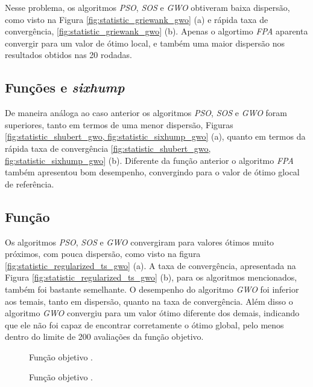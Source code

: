 \documentclass[a4paper, 11pt]{article}
\begin{document}
Nesse problema, os algoritmos \textit{PSO}, \textit{SOS} e \textit{GWO} obtiveram baixa dispersão, como visto na Figura \ref{fig:statistic_griewank_gwo} (a) e rápida taxa de convergência, \ref{fig:statistic_griewank_gwo} (b). Apenas o algortimo \textit{FPA} aparenta convergir para um valor de ótimo local, e também uma maior dispersão nos resultados obtidos nas 20 rodadas.

\subsection{Funções  e \textit{sixhump}}

De maneira análoga ao caso anterior os algoritmos \textit{PSO}, \textit{SOS} e \textit{GWO} foram superiores, tanto em termos de uma menor dispersão, Figuras \ref{fig:statistic_shubert_gwo, fig:statistic_sixhump_gwo} (a), quanto em termos da rápida taxa de convergência \ref{fig:statistic_shubert_gwo, fig:statistic_sixhump_gwo} (b). Diferente da função anterior o algoritmo \textit{FPA} também apresentou bom desempenho, convergindo para o valor de ótimo glocal de referência.

\subsection{Função }

Os algoritmos \textit{PSO}, \textit{SOS} e \textit{GWO} convergiram para valores ótimos muito próximos, com pouca dispersão, como visto na figura \ref{fig:statistic_regularized_ts_gwo} (a). A taxa de convergência, apresentada na Figura \ref{fig:statistic_regularized_ts_gwo} (b), para os algoritmos mencionados, também foi bastante semelhante. O desempenho do algoritmo \textit{GWO} foi inferior aos temais, tanto em dispersão, quanto na taxa de convergência. Além disso o algoritmo \textit{GWO} convergiu para um valor ótimo diferente dos demais, indicando que ele não foi capaz de encontrar corretamente o ótimo global, pelo menos dentro do limite de 200 avaliações da função objetivo. 

\begin{figure}[!ht]
    \centering
    \caption{Função objetivo .}
    \label{fig:statistic_easom_gwo}
    \subfloat[Dispersão.]{%
        \scalebox{.8}{}
    }
    \subfloat[Convergência.]{%
        \scalebox{.8}{}
    }
\end{figure}

\begin{figure}[!ht]
    \centering
    \caption{Função objetivo .}
    \label{fig:statistic_eggholder_gwo}
    \subfloat[Dispersão.]{%
        \scalebox{.8}{}
    }
    \subfloat[Convergência.]{%
        \scalebox{.8}{}
    }
\end{figure}
\end{document}
